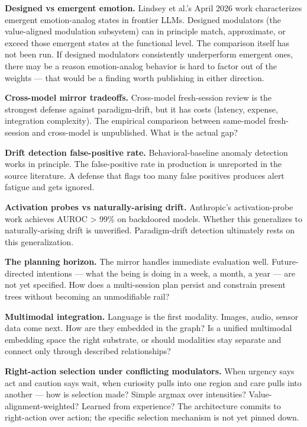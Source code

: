 \documentclass[12pt]{article}
\begin{document}
\textbf{Designed vs emergent emotion.} Lindsey et al.'s April 2026 work characterizes emergent emotion-analog states in frontier LLMs. Designed modulators (the value-aligned modulation subsystem) can in principle match, approximate, or exceed those emergent states at the functional level. The comparison itself has not been run. If designed modulators consistently underperform emergent ones, there may be a reason emotion-analog behavior is hard to factor out of the weights --- that would be a finding worth publishing in either direction.

\textbf{Cross-model mirror tradeoffs.} Cross-model fresh-session review is the strongest defense against paradigm-drift, but it has costs (latency, expense, integration complexity). The empirical comparison between same-model fresh-session and cross-model is unpublished. What is the actual gap?

\textbf{Drift detection false-positive rate.} Behavioral-baseline anomaly detection works in principle. The false-positive rate in production is unreported in the source literature. A defense that flags too many false positives produces alert fatigue and gets ignored.

\textbf{Activation probes vs naturally-arising drift.} Anthropic's activation-probe work achieves AUROC \textgreater{} 99\% on backdoored models. Whether this generalizes to naturally-arising drift is unverified. Paradigm-drift detection ultimately rests on this generalization.

\textbf{The planning horizon.} The mirror handles immediate evaluation well. Future-directed intentions --- what the being is doing in a week, a month, a year --- are not yet specified. How does a multi-session plan persist and constrain present trees without becoming an unmodifiable rail?

\textbf{Multimodal integration.} Language is the first modality. Images, audio, sensor data come next. How are they embedded in the graph? Is a unified multimodal embedding space the right substrate, or should modalities stay separate and connect only through described relationships?

\textbf{Right-action selection under conflicting modulators.} When urgency says act and caution says wait, when curiosity pulls into one region and care pulls into another --- how is selection made? Simple argmax over intensities? Value-alignment-weighted? Learned from experience? The architecture commits to right-action over action; the specific selection mechanism is not yet pinned down.
\end{document}
